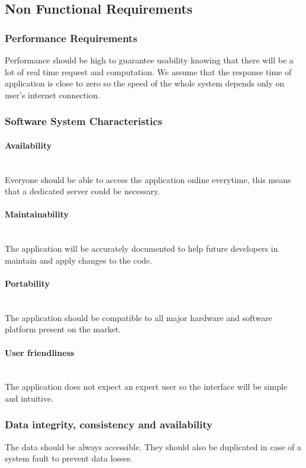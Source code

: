 \subsection{Non Functional Requirements}
	\subsubsection{Performance Requirements} Performance should be high to guarantee usability knowing that there will be a lot of real time request and computation. We assume that the response time of application is close to zero so the speed of the whole system depends only on user's internet connection.
	\subsubsection{Software System Characteristics}
		\paragraph{Availability} \hfill \\ Everyone should be able to access the application online everytime, this means that a dedicated server could be necessary.
		\paragraph {Maintainability} \hfill \\ The application will be accurately documented to help future developers in maintain and apply changes to the code.
		\paragraph{Portability} \hfill \\  The application should be compatible to all major hardware and software platform present on the market.
		\paragraph{User friendliness} \hfill \\ The application does not expect an expert user so the interface will be simple and intuitive. 
	\subsubsection{Data integrity, consistency and availability} The data should be always accessible. They should also be duplicated in case of a system fault to prevent data losses.